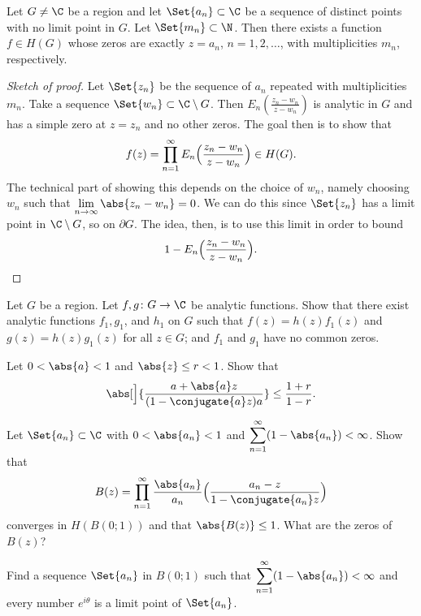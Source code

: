 \begin{theorem}\label{thm8.9}
	Let $G \neq \C$ be a region and let $\Set{a_n} \subset \C$ be a sequence of distinct points with no limit point in $G$.
	Let $\Set{m_n} \subset \N$.
	Then there exists a function $f \in H(G)$ whose zeros are exactly $z = a_n$, $n = 1, 2, \dots$, with multiplicities $m_n$, respectively.
\end{theorem}

\begin{proof}[Sketch of proof]
	Let $\Set{z_n}$ be the sequence of $a_n$ repeated with multiplicities $m_n$.
	Take a sequence $\Set{w_n} \subset \C \setminus G$.
	Then $E_n( \frac{z_n - w_n}{z - w_n} )$ is analytic in $G$ and has a simple zero at $z = z_n$ and no other zeros.
	The goal then is to show that
	\[
		f(z) = \prod_{n = 1}^\infty E_n \Bigl( \frac{z_n - w_n}{z - w_n} \Bigr) \in H(G).
	\]
	The technical part of showing this depends on the choice of $w_n$, namely choosing $w_n$ such that $\lim\limits_{n \to \infty} \abs{z_n - w_n} = 0$.
	We can do this since $\Set{z_n}$ has a limit point in $\C \setminus G$, so on $\partial G$.
	The idea, then, is to use this limit in order to bound
	\[
		1 - E_n\Bigl( \frac{z_n - w_n}{z - w_n} \Bigr). \qedhere
	\]
\end{proof}

\begin{exercise}
	Let $G$ be a region.
	Let $f, g \colon G \to \C$ be analytic functions.
	Show that there exist analytic functions $f_1, g_1$, and $h_1$ on $G$ such that $f(z) = h(z) f_1(z)$ and $g(z) = h(z) g_1(z)$ for all $z \in G$; and $f_1$ and $g_1$ have no common zeros.
\end{exercise}

\begin{exercise}
	\begin{parts}
		\item Let $0 < \abs{a} < 1$ and $\abs{z} \leq r < 1$.
		Show that
		\[
			\abs[\Big]{\frac{a + \abs{a} z}{(1 - \conjugate{a} z) a}} \leq \frac{1 + r}{1 - r}.
		\]
		\item Let $\Set{a_n} \subset \C$ with $0 < \abs{a_n} < 1$ and $\displaystyle \sum_{n = 1}^\infty (1 - \abs{a_n}) < \infty$.
		Show that
		\[
			B(z) = \prod_{n = 1}^\infty \frac{\abs{a_n}}{a_n} \Bigl( \frac{a_n - z}{1 - \conjugate{a_n} z} \Bigr)
		\]
		converges in $H(B(0; 1))$ and that $\abs{B(z)} \leq 1$.
		What are the zeros of $B(z)$?

		\item Find a sequence $\Set{a_n}$ in $B(0; 1)$ such that $\displaystyle \sum_{n = 1}^\infty (1 - \abs{a_n}) < \infty$ and every number $e^{i \theta}$ is a limit point of $\Set{a_n}$. \qedhere
	\end{parts}
\end{exercise}


